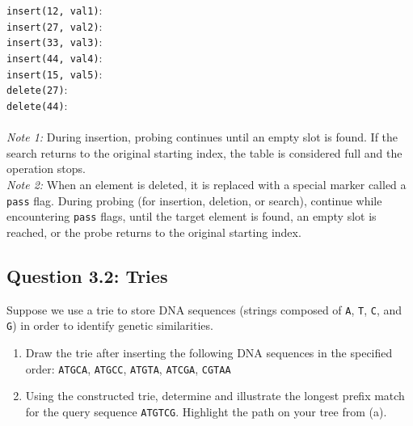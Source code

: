 \documentclass[12pt]{article}
\begin{document}
\texttt{insert(12, val1)}: \numbox[2cm] \\
\texttt{insert(27, val2)}: \numbox[2cm] \\
\texttt{insert(33, val3)}: \numbox[2cm] \\ 
\texttt{insert(44, val4)}: \numbox[2cm] \\ 
\texttt{insert(15, val5)}: \numbox[2cm] \\
\texttt{delete(27)}:\hspace{13mm} \numbox[2cm] \\
\texttt{delete(44)}:\hspace{13mm} \numbox[2cm]
\\~\\
\textit{Note 1:} During insertion, probing continues until an empty slot is found. If the search returns to the original starting index, the table is considered full and the operation stops.
\\[2ex]
\textit{Note 2:} When an element is deleted, it is replaced with a special marker called a \texttt{pass} flag. During probing (for insertion, deletion, or search), continue while encountering \texttt{pass} flags, until the target element is found, an empty slot is reached, or the probe returns to the original starting index.

\newpage

\subsection*{Question 3.2: Tries}
\points[4] Suppose we use a trie to store DNA sequences (strings composed of \texttt{A}, \texttt{T}, \texttt{C}, and \texttt{G}) in order to identify genetic similarities.
\begin{enumerate}
\item[(a)] \points[3] Draw the trie after inserting the following DNA sequences in the specified order: \texttt{ATGCA}, \texttt{ATGCC}, \texttt{ATGTA}, \texttt{ATCGA}, \texttt{CGTAA}
\vspace{12cm}
\item[(b)] \points[1] Using the constructed trie, determine and illustrate the longest prefix match for the query sequence \texttt{ATGTCG}. Highlight the path on your tree from (a).
\end{enumerate}

\newpage 
\end{document}

